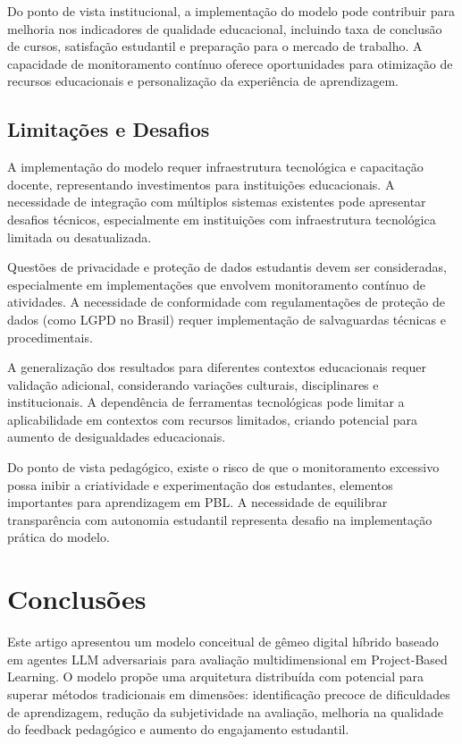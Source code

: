 \documentclass[english, spanish, brazilian]{modelo_dt}
\begin{document}
Do ponto de vista institucional, a implementação do modelo pode contribuir para
melhoria nos indicadores de qualidade educacional, incluindo taxa de conclusão
de cursos, satisfação estudantil e preparação para o mercado de trabalho\@. A
capacidade de monitoramento contínuo oferece oportunidades para otimização de
recursos educacionais e personalização da experiência de aprendizagem\@.

\subsection{Limitações e Desafios}

A implementação do modelo requer infraestrutura tecnológica e capacitação
docente, representando investimentos para instituições educacionais\@. A
necessidade de integração com múltiplos sistemas existentes pode apresentar
desafios técnicos, especialmente em instituições com infraestrutura tecnológica
limitada ou desatualizada\@.

Questões de privacidade e proteção de dados estudantis devem ser consideradas,
especialmente em implementações que envolvem monitoramento contínuo de
atividades\@. A necessidade de conformidade com regulamentações de proteção de
dados (como LGPD no Brasil) requer implementação de salvaguardas técnicas e
procedimentais\@.

A generalização dos resultados para diferentes contextos educacionais requer
validação adicional, considerando variações culturais, disciplinares e
institucionais\@. A dependência de ferramentas tecnológicas pode limitar a
aplicabilidade em contextos com recursos limitados, criando potencial para
aumento de desigualdades educacionais\@.

Do ponto de vista pedagógico, existe o risco de que o monitoramento excessivo
possa inibir a criatividade e experimentação dos estudantes, elementos
importantes para aprendizagem em PBL\@. A necessidade de equilibrar
transparência com autonomia estudantil representa desafio na implementação
prática do modelo\@.

\section{Conclusões}

Este artigo apresentou um modelo conceitual de gêmeo digital híbrido baseado em
agentes LLM adversariais para avaliação multidimensional em Project-Based
Learning\@. O modelo propõe uma arquitetura distribuída com potencial para
superar métodos tradicionais em dimensões: identificação precoce de
dificuldades de aprendizagem, redução da subjetividade na avaliação, melhoria
na qualidade do feedback pedagógico e aumento do engajamento estudantil\@.
\end{document}
